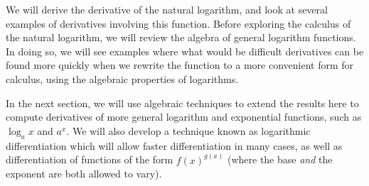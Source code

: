 We will derive the derivative of the natural logarithm,
and look at several examples of derivatives involving
this function.  
Before exploring the calculus of the natural logarithm, we
will review the algebra of general logarithm functions.
In doing so, we will see examples where what would be
difficult derivatives can be found more quickly when we
rewrite the function to a more convenient form for calculus,
using the algebraic properties of logarithms.

In the next section, we will use algebraic techniques to
extend the results here to
compute derivatives of more general logarithm and exponential
functions, such as $\log_ax$ and $a^x$.  We will also
develop a technique known as logarithmic differentiation
which will allow faster differentiation in many cases,
as well as differentiation of functions of the 
form $f(x)^{g(x)}$ (where the base {\it and} the exponent
are both allowed to vary).

